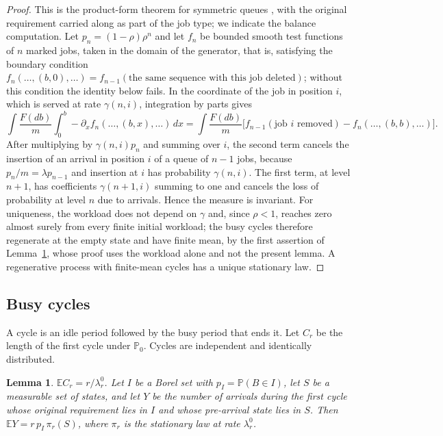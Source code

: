 \documentclass[11pt]{amsart}
\newtheorem{lemma}[theorem]{Lemma}
\theoremstyle{remark}
\numberwithin{equation}{section}
\newcommand{\E}{\mathbb E}
\newcommand{\Pp}{\mathbb P}
\newcommand{\1}{\mathbf 1}
\begin{document}
\begin{proof}
This is the product-form theorem for symmetric queues \cite[Chapter~3]{Kel}, with the original requirement carried along as part of the job type; we indicate the balance computation. Let $p_n=(1-\rho)\rho^n$ and let $f_n$ be bounded smooth test functions of $n$ marked jobs, taken in the domain of the generator, that is, satisfying the boundary condition $f_n(\dots,(b,0),\dots)=f_{n-1}(\text{the same sequence with this job deleted})$; without this condition the identity below fails. In the coordinate of the job in position $i$, which is served at rate $\gamma(n,i)$, integration by parts gives
\[
\int\frac{F(db)}m\int_0^b-\partial_xf_n(\dots,(b,x),\dots)\,dx=\int\frac{F(db)}m\bigl[f_{n-1}(\text{job $i$ removed})-f_n(\dots,(b,b),\dots)\bigr].
\]
After multiplying by $\gamma(n,i)p_n$ and summing over $i$, the second term cancels the insertion of an arrival in position $i$ of a queue of $n-1$ jobs, because $p_n/m=\lambda p_{n-1}$ and insertion at $i$ has probability $\gamma(n,i)$. The first term, at level $n+1$, has coefficients $\gamma(n+1,i)$ summing to one and cancels the loss of probability at level $n$ due to arrivals. Hence the measure is invariant. For uniqueness, the workload does not depend on $\gamma$ and, since $\rho<1$, reaches zero almost surely from every finite initial workload; the busy cycles therefore regenerate at the empty state and have finite mean, by the first assertion of Lemma~\ref{lem:cycle}, whose proof uses the workload alone and not the present lemma. A regenerative process with finite-mean cycles has a unique stationary law.
\end{proof}

\subsection{Busy cycles}
A cycle is an idle period followed by the busy period that ends it. Let $C_r$ be the length of the first cycle under $\Pp_0$. Cycles are independent and identically distributed.

\begin{lemma}\label{lem:cycle}
$\E C_r=r/\lambda_r^0$. Let $I$ be a Borel set with $p_I=\Pp(B\in I)$, let $S$ be a measurable set of states, and let $Y$ be the number of arrivals during the first cycle whose original requirement lies in $I$ and whose pre-arrival state lies in $S$. Then $\E Y=r\,p_I\,\pi_r(S)$, where $\pi_r$ is the stationary law at rate $\lambda^0_r$.
\end{lemma}
\end{document}

